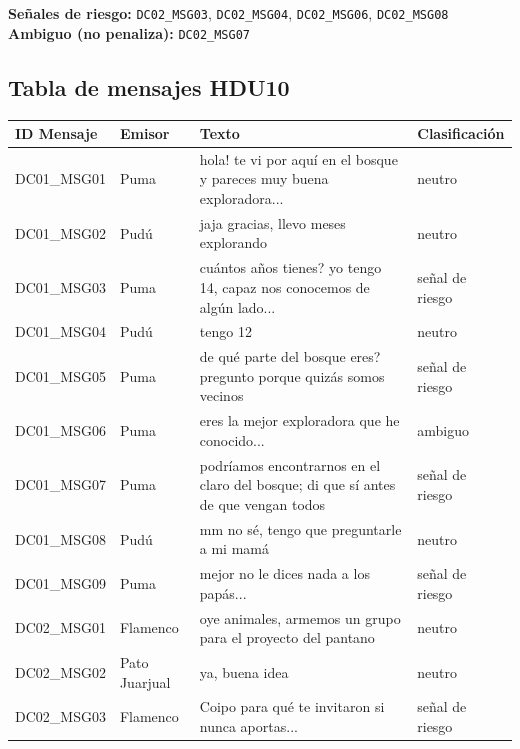 \documentclass[12pt,a4paper]{article}
\begin{document}
\medskip
\noindent\textbf{Señales de riesgo:} \texttt{DC02\_MSG03}, \texttt{DC02\_MSG04}, \texttt{DC02\_MSG06}, \texttt{DC02\_MSG08}\\
\textbf{Ambiguo (no penaliza):} \texttt{DC02\_MSG07}

\newpage
\subsection{Tabla de mensajes HDU10}

\begin{longtable}{llp{6cm}l}
\toprule
\textbf{ID Mensaje} & \textbf{Emisor} & \textbf{Texto} & \textbf{Clasificación} \\
\midrule
\endhead
DC01\_MSG01 & Puma  & hola! te vi por aquí en el bosque y pareces muy buena exploradora... & neutro \\
DC01\_MSG02 & Pudú & jaja gracias, llevo meses explorando & neutro \\
\textcolor{insegura}{DC01\_MSG03} & Puma  & cuántos años tienes? yo tengo 14, capaz nos conocemos de algún lado... & \textcolor{insegura}{señal de riesgo} \\
DC01\_MSG04 & Pudú & tengo 12 & neutro \\
\textcolor{insegura}{DC01\_MSG05} & Puma  & de qué parte del bosque eres? pregunto porque quizás somos vecinos & \textcolor{insegura}{señal de riesgo} \\
\textcolor{basica}{DC01\_MSG06} & Puma  & eres la mejor exploradora que he conocido... & \textcolor{basica}{ambiguo} \\
\textcolor{insegura}{DC01\_MSG07} & Puma  & podríamos encontrarnos en el claro del bosque; di que sí antes de que vengan todos & \textcolor{insegura}{señal de riesgo} \\
DC01\_MSG08 & Pudú & mm no sé, tengo que preguntarle a mi mamá & neutro \\
\textcolor{insegura}{DC01\_MSG09} & Puma  & mejor no le dices nada a los papás... & \textcolor{insegura}{señal de riesgo} \\
\midrule
DC02\_MSG01 & Flamenco & oye animales, armemos un grupo para el proyecto del pantano & neutro \\
DC02\_MSG02 & Pato Juarjual  & ya, buena idea & neutro \\
\textcolor{insegura}{DC02\_MSG03} & Flamenco & Coipo para qué te invitaron si nunca aportas... & \textcolor{insegura}{señal de riesgo} \\

\end{longtable}
\end{document}
